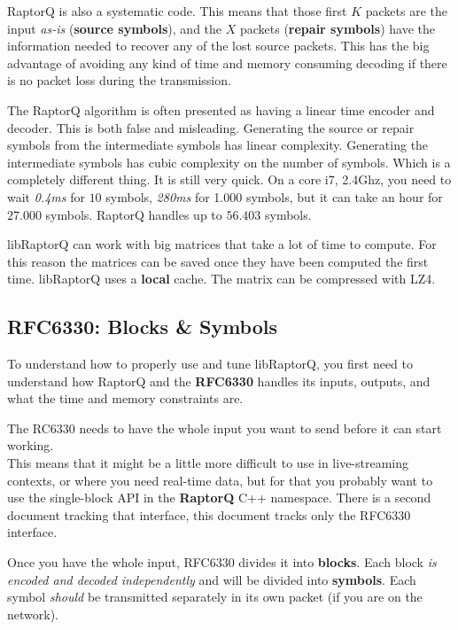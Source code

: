 \documentclass[11pt,a4paper]{refart}
\begin{document}
 RaptorQ is also a systematic code. This means that those first $K$ packets are the input \textit{as-is} (\textbf{source symbols}),
and the $X$ packets (\textbf{repair symbols}) have the information needed to recover any of the lost source packets. This has the big advantage of
avoiding any kind of time and memory consuming decoding if there is no packet loss during the transmission.

 The RaptorQ algorithm is often presented as having a linear time encoder and decoder. This is both false and misleading.
Generating the source or repair symbols from the intermediate symbols has linear complexity. Generating the intermediate symbols has cubic complexity on the
number of symbols. Which is a completely different thing.
It is still very quick. On a core i7, 2.4Ghz, you need to wait \textit{0.4ms} for $10$ symbols, \textit{280ms} for 1.000 symbols, but it can take an hour for $27.000$ symbols.
RaptorQ handles up to $56.403$ symbols.

 libRaptorQ can work with big matrices that take a lot of time to compute. For this reason the matrices can be saved once they have
been computed the first time. libRaptorQ uses a \textbf{local} cache. The matrix can be compressed with LZ4.

\subsection{RFC6330: Blocks \& Symbols}

To understand how to properly use and tune libRaptorQ, you first need to understand how RaptorQ and the \textbf{RFC6330} handles its inputs, outputs, and what the time and memory
constraints are.

The RC6330 needs to have the whole input you want to send before it can start working.\\
This means that it might be a little more difficult to use in live-streaming contexts, or where you need real-time data, but for that you probably want to use the single-block API in the \textbf{RaptorQ} C++ namespace. There is a second document tracking that interface, this document tracks only the RFC6330 interface.

Once you have the whole input, RFC6330 divides it into \textbf{blocks}. Each block \textit{is encoded and decoded independently} and will be divided into \textbf{symbols}. Each symbol \textit{should}
be transmitted separately in its own packet (if you are on the network).
\end{document}
